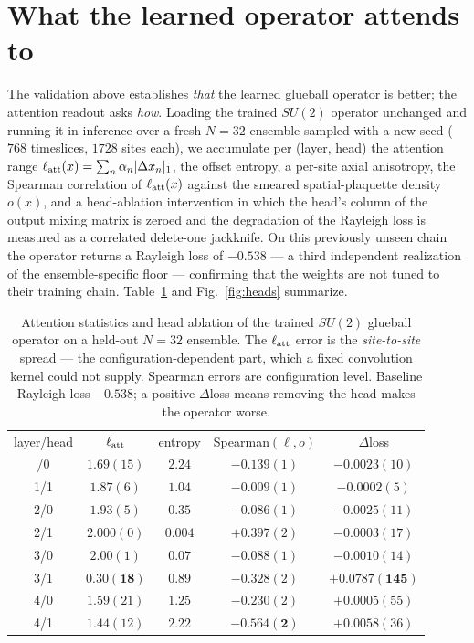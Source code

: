 \documentclass[aps,prl,reprint,superscriptaddress,nofootinbib]{revtex4-2}
\begin{document}
\section{What the learned operator attends to}
\label{sec:heads}

The validation above establishes \emph{that} the learned glueball operator is
better; the attention readout asks \emph{how}. Loading the trained $SU(2)$
operator unchanged and running it in inference over a fresh $N=32$ ensemble
sampled with a new seed ($768$ timeslices, $1728$ sites each), we accumulate per
(layer, head) the attention range $\ell_{\rm att}(x)=\sum_n\alpha_n|\Delta x_n|_1$,
the offset entropy, a per-site axial anisotropy, the Spearman correlation of
$\ell_{\rm att}(x)$ against the smeared spatial-plaquette density $o(x)$, and a
head-ablation intervention in which the head's column of the output mixing
matrix is zeroed and the degradation of the Rayleigh loss is measured as a
correlated delete-one jackknife. On this previously unseen chain the operator
returns a Rayleigh loss of $-0.538$ --- a third independent realization of the
ensemble-specific floor --- confirming that the weights are not tuned to their
training chain. Table~\ref{tab:heads} and Fig.~\ref{fig:heads} summarize.

\begin{table}[t]
\caption{Attention statistics and head ablation of the trained $SU(2)$ glueball
operator on a held-out $N=32$ ensemble. The $\ell_{\rm att}$ error is the
\emph{site-to-site} spread --- the configuration-dependent part, which a fixed
convolution kernel could not supply. Spearman errors are configuration level.
Baseline Rayleigh loss $-0.538$; a positive $\Delta$loss means removing the head
makes the operator worse.}
\label{tab:heads}
\begin{ruledtabular}
\begin{tabular}{ccccc}
layer/head & $\ell_{\rm att}$ & entropy & Spearman$(\ell,o)$ & $\Delta$loss\\
\colrule
1/0 & $1.69(15)$ & $2.24$ & $-0.139(1)$ & $-0.0023(10)$\\
1/1 & $1.87(6)$  & $1.04$ & $-0.009(1)$ & $-0.0002(5)$\\
2/0 & $1.93(5)$  & $0.35$ & $-0.086(1)$ & $-0.0025(11)$\\
2/1 & $2.000(0)$ & $0.004$& $+0.397(2)$ & $-0.0003(17)$\\
3/0 & $2.00(1)$  & $0.07$ & $-0.088(1)$ & $-0.0010(14)$\\
3/1 & $\bm{0.30(18)}$ & $0.89$ & $-0.328(2)$ & $\bm{+0.0787(145)}$\\
4/0 & $1.59(21)$ & $1.25$ & $-0.230(2)$ & $+0.0005(55)$\\
4/1 & $1.44(12)$ & $2.22$ & $\bm{-0.564(2)}$ & $+0.0058(36)$\\
\end{tabular}
\end{ruledtabular}
\end{table}
\end{document}
